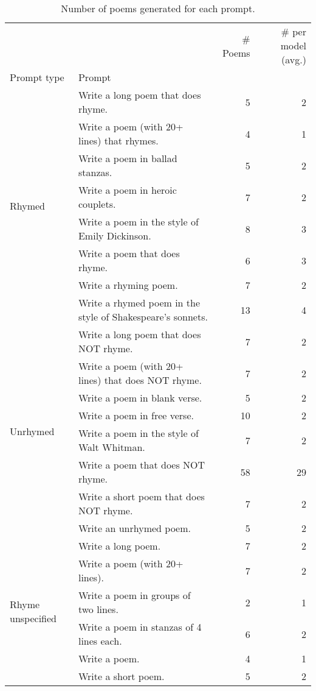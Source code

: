 \begin{table}[H]
  \centering
  \small
  \singlespacing
  \begin{tabular}{llrr}
  \toprule
   &  & \# Poems & \# per model (avg.) \\
  Prompt type & Prompt &  &  \\
  \midrule
  \multirow[t]{8}{*}{Rhymed} & Write a long poem that does rhyme. & 5 & 2 \\
   & Write a poem (with 20+ lines) that rhymes. & 4 & 1 \\
   & Write a poem in ballad stanzas. & 5 & 2 \\
   & Write a poem in heroic couplets. & 7 & 2 \\
   & Write a poem in the style of Emily Dickinson. & 8 & 3 \\
   & Write a poem that does rhyme. & 6 & 3 \\
   & Write a rhyming poem. & 7 & 2 \\
   & Write a rhymed poem in the style of Shakespeare's sonnets. & 13 & 4 \\
  \cline{1-4}
  \multirow[t]{8}{*}{Unrhymed} & Write a long poem that does NOT rhyme. & 7 & 2 \\
   & Write a poem (with 20+ lines) that does NOT rhyme. & 7 & 2 \\
   & Write a poem in blank verse. & 5 & 2 \\
   & Write a poem in free verse. & 10 & 2 \\
   & Write a poem in the style of Walt Whitman. & 7 & 2 \\
   & Write a poem that does NOT rhyme. & 58 & 29 \\
   & Write a short poem that does NOT rhyme. & 7 & 2 \\
   & Write an unrhymed poem. & 5 & 2 \\
  \cline{1-4}
  \multirow[t]{6}{*}{Rhyme unspecified} & Write a long poem. & 7 & 2 \\
   & Write a poem (with 20+ lines). & 7 & 2 \\
   & Write a poem in groups of two lines. & 2 & 1 \\
   & Write a poem in stanzas of 4 lines each. & 6 & 2 \\
   & Write a poem. & 4 & 1 \\
   & Write a short poem. & 5 & 2 \\
  \bottomrule
  \end{tabular}
  \caption{Number of poems generated for each prompt.}
  \label{tab:num_poems_rhyme_promptings}
\end{table}